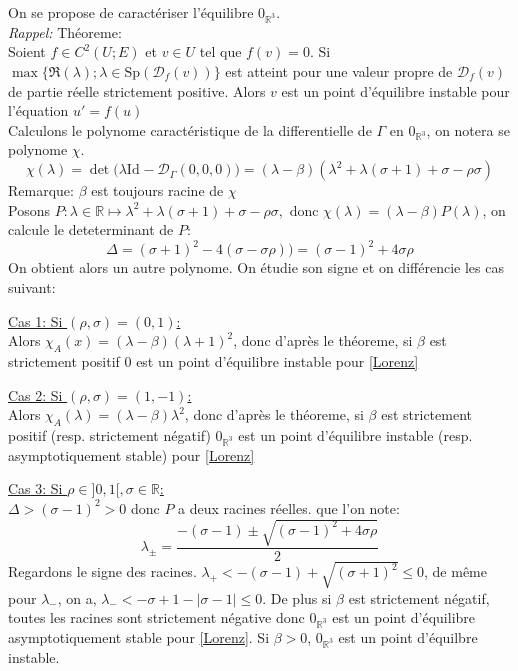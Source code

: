 \documentclass{article}
\newcommand{\R}{\mathbb{R}}
\newcommand{\id}[1][]{\ensuremath{\mathrm{Id}_{#1}}}
\begin{document}
On se propose de caractériser l'équilibre $0_{\R^3}$.\\
\textit{Rappel:} Théoreme:\\
Soient $f\in C^2(U;E)$ et $v\in U$ tel que $f(v)=0$. Si $\max\{\Re(\lambda); \lambda\in \mathrm{Sp}(\mathcal{D}_f(v))\}$ est atteint pour une valeur propre de $\mathcal{D}_f(v)$ de partie réelle strictement positive. Alors $v$ est un point d'équilibre instable pour l'équation $u'=f(u)$ \\
Calculons le polynome caractéristique de la differentielle de $\Gamma$ en $0_{\R^3}$, on notera se polynome $\chi$.
\[
    \chi (\lambda) = \det\big(\lambda\id - \mathcal{D}_{\Gamma}(0,0,0)\big) = (\lambda - \beta)(\lambda^2 + \lambda(\sigma+1)+\sigma-\rho\sigma)
\]
Remarque: $\beta$ est toujours racine de $\chi$\\
Posons $P:\lambda \in \R \mapsto \lambda^2 + \lambda(\sigma+1)+\sigma-\rho\sigma,\text{ donc }\chi(\lambda)=(\lambda-\beta)P(\lambda)$, on calcule le deteterminant de $P$:
\[
  \Delta = (\sigma+1)^2 - 4(\sigma-\sigma\rho)) = (\sigma-1)^2 +4\sigma\rho
\]
On obtient alors un autre polynome. On étudie son signe et on différencie les cas suivant:

\underline{Cas 1: Si $(\rho,\sigma)=(0,1)$:}\\
Alors $\chi_A(x) = (\lambda-\beta)(\lambda+1)^2$, donc d'après le théoreme, si $\beta$ est strictement positif $0$ est un point d'équilibre instable pour \eqref{Lorenz}

\underline{Cas 2: Si $(\rho,\sigma)=(1,-1)$:}\\
Alors $\chi_A(\lambda) = (\lambda-\beta)\lambda^2$, donc d'après le théoreme, si $\beta$ est strictement positif (resp. strictement négatif) $0_{\R^3}$ est un point d'équilibre instable (resp. asymptotiquement stable) pour \eqref{Lorenz}


\underline{Cas 3: Si $\rho \in ]0,1[, \sigma \in \mathbb{R}$:}\\
$\Delta> (\sigma-1)^2 >0$ donc $P$ a deux racines réelles.
que l'on note: 
\[
    \lambda_\pm = \frac{-(\sigma-1)\pm \sqrt{(\sigma-1)^2 + 4\sigma\rho}}{2}
\]
Regardons le signe des racines. $\lambda_+ < -(\sigma-1)+ \sqrt{(\sigma+1)^2} \le 0 $, de même pour $\lambda_-$, on a, $\lambda_- < - \sigma +1- |\sigma - 1| \le 0$. De plus si $\beta$ est strictement négatif, toutes les racines sont strictement négative donc $0_{\R^3}$ est un point d'équilibre asymptotiquement stable pour \eqref{Lorenz}. Si $\beta > 0$, $0_{\R^3}$ est un point d'équilbre instable.
\end{document}

